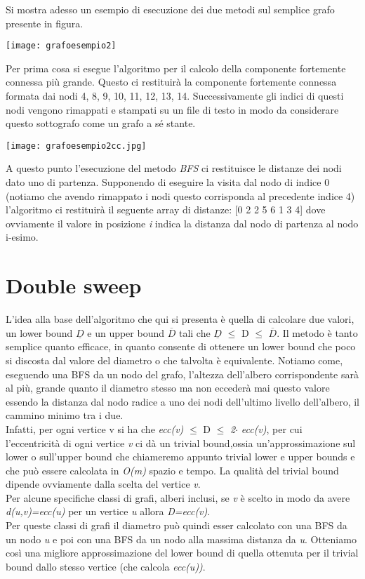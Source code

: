 \documentclass[twoside,openright,titlepage,fleqn,
	headinclude,11pt,a4paper,BCOR5mm,footinclude,pdftex
	]{scrbook}
\begin{document}
\newpage
Si mostra adesso un  esempio di esecuzione dei due metodi sul semplice grafo presente in figura.
\begin{center}
\texttt{[image: grafoesempio2]}
\end{center}
Per prima cosa si esegue l'algoritmo per il calcolo della componente fortemente connessa più grande. Questo ci restituirà la componente fortemente connessa formata dai nodi 4, 8, 9, 10, 11, 12, 13, 14. Successivamente gli indici di questi nodi vengono rimappati e stampati su un file di testo in modo da considerare questo sottografo come un grafo a sé stante.
\begin{center}
\texttt{[image: grafoesempio2cc.jpg]}
\end{center}
A questo punto l'esecuzione del metodo \textit{BFS} ci restituisce le distanze dei nodi dato uno di partenza. Supponendo di eseguire la visita dal nodo di indice 0 (notiamo che avendo rimappato i nodi questo corrisponda al precedente indice 4) l'algoritmo ci restituirà il seguente array di distanze: [0 2 2 5 6 1 3 4] dove ovviamente il valore in posizione \textit{i} indica la distanza dal nodo di partenza al nodo i-esimo.
\chapter{Double sweep}
L'idea alla base dell'algoritmo che qui si presenta è quella di calcolare due valori, un lower bound $\underline{D}$ e un upper bound $\overline{D}$ tali che $\underline{D}$ $\leq$ D $\leq $ $\overline{D}$.
Il metodo è tanto semplice quanto efficace, in quanto consente di ottenere un lower bound che poco si discosta dal valore del diametro o che talvolta è equivalente. Notiamo come, eseguendo una BFS da un nodo del grafo, l'altezza dell'albero corrispondente sarà al più, grande quanto il diametro stesso ma non eccederà mai questo valore essendo la distanza dal nodo radice a uno dei nodi dell'ultimo livello dell'albero, il cammino minimo tra i due.\\Infatti, per ogni vertice v si ha che \textit{ecc(v)} $\leq$ D $\leq$ \textit{2}$\cdot $ \textit{ecc(v)}, per cui l'eccentricità di ogni vertice \textit{v} ci dà un trivial bound,ossia un'approssimazione sul lower o sull'upper bound che chiameremo appunto trivial lower e upper bounds e che può essere calcolata in \textit{O(m)} spazio e tempo. La qualità del trivial bound  dipende ovviamente dalla scelta del vertice \textit{v}.\\Per alcune specifiche classi di grafi, alberi inclusi, se \textit{v} è scelto in modo da avere\textit{ d(u,v)=ecc(u)} per un vertice \textit{u} allora \textit{D=ecc(v)}.\\Per queste classi di grafi il diametro può quindi esser calcolato con una BFS da un nodo \textit{u} e poi con una BFS da un nodo alla massima distanza da \textit{u}. Otteniamo così una migliore approssimazione del lower bound di quella ottenuta per il trivial bound dallo stesso vertice (che calcola \textit{ecc(u))}.\\
\end{document}
